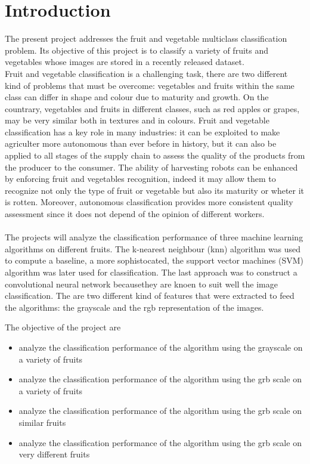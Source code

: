 \documentclass{article}
\begin{document}
\section{Introduction}


The present project addresses the fruit and vegetable multiclass classification problem. Its objective of this project is to classify a variety of fruits and vegetables whose images are stored in a recently released dataset.\\
Fruit and vegetable classification is a challenging task, there are two different kind of problems that must be overcome: vegetables and fruits within the same class can differ in shape and colour due to maturity and growth. On the countrary, vegetables and fruits in different classes, such as red apples or grapes, may be very similar both in textures and in colours. 
Fruit and vegetable classification has a key role in many industries: it can be exploited to make agriculter more autonomous than ever before in history, but it can also be applied to all stages of the supply chain to assess the quality of the products from the producer to the consumer. 
The ability of harvesting robots can be enhanced by enforcing fruit and vegetables recognition, indeed it may allow them to recognize not only the type of fruit or vegetable but also its maturity or wheter it is rotten. Moreover, autonomous classification provides more consistent quality assessment since it does not depend of the opinion of different workers.
\\\\
The projects will analyze the classification performance of three machine learning algorithms on different fruits. The k-nearest neighbour (knn) algorithm was used to compute a baseline, a more sophistocated, the support vector machines (SVM) algorithm was later used for classification. The last approach was to construct a convolutional neural network becausethey are knoen to suit well the image classification. The are two different kind of features that were extracted to feed the algorithms: the grayscale and the rgb representation of the images.

The objective of the project are
\begin{itemize}
\item analyze the classification performance of the algorithm using the grayscale on a variety of fruits
\item analyze the classification performance of the algorithm using the grb scale on a variety of fruits
\item   analyze the classification performance of the algorithm using the grb scale on similar fruits
\item   analyze the classification performance of the algorithm using the grb scale on very different fruits
\end{itemize}
\end{document}
